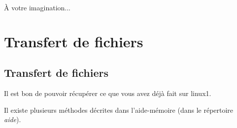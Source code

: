 \documentclass[11pt,a4paper]{article}
\begin{document}
            \par
        
					\`A votre imagination...
				
            \par
        \section{Transfert de fichiers}\subsection{Transfert de fichiers}  
          Il est bon de pouvoir r\'ecup\'erer ce que vous avez d\'ej\`a fait sur linux1. \par
				
          Il existe plusieurs m\'ethodes d\'ecrites dans l'aide-m\'emoire (dans le r\'epertoire \textit{aide}). 
        
            \par
        
\end{document}
